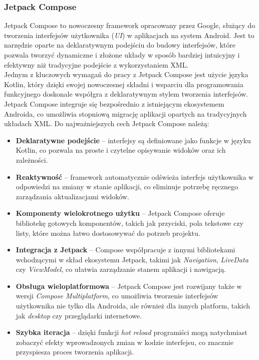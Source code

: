 \documentclass[12pt]{article}
\begin{document}
\subsubsection{Jetpack Compose}
Jetpack Compose to nowoczesny framework opracowany przez Google, służący do tworzenia interfejsów użytkownika (\textit{UI}) w aplikacjach na system Android.
Jest to narzędzie oparte na deklaratywnym podejściu do budowy interfejsów, które pozwala tworzyć dynamiczne i złożone układy w sposób bardziej intuicyjny i efektywny
niż tradycyjne podejście z wykorzystaniem XML.\\
Jednym z kluczowych wymagań do pracy z Jetpack Compose jest użycie języka Kotlin, który dzięki swojej nowoczesnej składni i wsparciu dla programowania funkcyjnego
doskonale współgra z deklaratywnym stylem tworzenia interfejsów. Jetpack Compose integruje się bezpośrednio z istniejącym ekosystemem Androida,
co umożliwia stopniową migrację aplikacji opartych na tradycyjnych układach XML.
Do najważniejszych cech Jetpack Compose należą:
\begin{itemize}
    \item \textbf{Deklaratywne podejście} – interfejsy są definiowane jako funkcje w języku Kotlin, co pozwala na proste i czytelne opisywanie widoków oraz ich zależności.
    \item \textbf{Reaktywność} – framework automatycznie odświeża interfejs użytkownika w odpowiedzi na zmiany w stanie aplikacji,
	co eliminuje potrzebę ręcznego zarządzania aktualizacjami widoków.
    \item \textbf{Komponenty wielokrotnego użytku} – Jetpack Compose oferuje bibliotekę gotowych komponentów, takich jak przyciski, pola tekstowe czy listy,
	które można łatwo dostosowywać do potrzeb projektu.
    \item \textbf{Integracja z Jetpack} – Compose współpracuje z innymi bibliotekami wchodzącymi w skład ekosystemu Jetpack, takimi jak
	\textit{Navigation}, \textit{LiveData} czy \textit{ViewModel}, co ułatwia zarządzanie stanem aplikacji i nawigacją.
    \item \textbf{Obsługa wieloplatformowa} – Jetpack Compose jest rozwijany także w wersji \textit{Compose Multiplatform},
	co umożliwia tworzenie interfejsów użytkownika nie tylko dla Androida, ale również dla innych platform, takich jak \textit{desktop} czy przeglądarki internetowe.
    \item \textbf{Szybka iteracja} – dzięki funkcji \textit{hot reload} programiści mogą natychmiast zobaczyć efekty wprowadzonych zmian w kodzie interfejsu, co znacznie przyspiesza proces tworzenia aplikacji.
\end{itemize}
\end{document}
